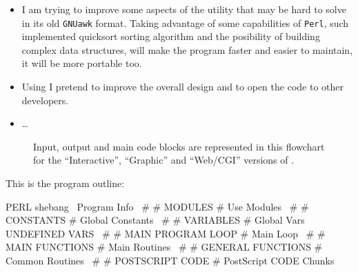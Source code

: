 \documentclass[11pt]{article}
\def\nwendcode{\endtrivlist \endgroup} %
\let\nwdocspar=\par                    %
\begin{document}
\begin{itemize}
\item I am trying to improve some aspects of the {\prog} utility that may be hard to solve in its old \texttt{GNUawk} format. Taking advantage of some capabilities of \texttt{Perl}, such implemented quicksort sorting algorithm and the posibility of building complex data structures, will make the program faster and easier to maintain, it will be more portable too. 

\item Using {\noweb} I pretend to improve the overall design and to open the code to other developers.

\item \ldots 
\end{itemize}


\begin{itemize}
 
\end{itemize}

\label{todo:AAB}
\nwenddocs{}%
%
\nwdocspar
\nwenddocs{}%
%
\nwdocspar
\todo{ \item \todoAAB } %

\begin{figure}[!ht]
\begin{center}
\fbox{\parbox[c][8cm][c]{\linewidth}{\hfill}}
\caption[Future modes of {\prog}.]{\label{fig:othermodes} Input, output and main code blocks are represented in this flowchart for the ``Interactive'', ``Graphic'' and ``Web/CGI'' versions of {\prog}.}
\end{center}
\end{figure}


\newpage


This is the {\prog} program outline:

\nwenddocs{}\endmoddef
\LA{}PERL shebang~{\nwtagstyle{}}\RA{}
\LA{}Program Info~{\nwtagstyle{}}\RA{}
#
# MODULES
#
\LA{}Use Modules~{\nwtagstyle{}}\RA{}
#
# CONSTANTS
#
\LA{}Global Constants~{\nwtagstyle{}}\RA{}
#
# VARIABLES
#
\LA{}Global Vars~{\nwtagstyle{}}\RA{}
\LA{}UNDEFINED VARS~{\nwtagstyle{}}\RA{}
#
# MAIN PROGRAM LOOP
#
\LA{}Main Loop~{\nwtagstyle{}}\RA{}
#
# MAIN FUNCTIONS
#
\LA{}Main Routines~{\nwtagstyle{}}\RA{}
#
# GENERAL FUNCTIONS
#
\LA{}Common Routines~{\nwtagstyle{}}\RA{}
#
# POSTSCRIPT CODE
#
\LA{}PostScript CODE Chunks~{\nwtagstyle{}}\RA{}
\nwendcode{}\nwdocspar
\end{document}
